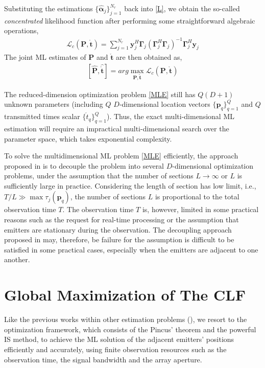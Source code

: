 \documentclass[review]{elsarticle}
\begin{document}
Substituting the estimations $\lbrace \hat{\boldsymbol{\alpha}}_j\rbrace _{j=1}^{N_r}$ back into \eqref{L}, we obtain the so-called \emph{concentrated} likelihood function after performing some straightforward algebraic operations,
\begin{align}\label{CLF}
    \mathcal{L}_c(\boldsymbol{P},\mathring{\boldsymbol{t}})=\sum_{j=1}^{N_r}\boldsymbol{y}_j^H\boldsymbol{\Gamma}_{j}(\boldsymbol{\Gamma}_{j}^H\boldsymbol{\Gamma}_{j})^{-1}\boldsymbol{\Gamma}_{j}^H\boldsymbol{y}_j
\end{align}
The joint ML estimates of $\boldsymbol{P}$ and $\mathring{\boldsymbol{t}}$ are then obtained as,
\begin{align}\label{MLE}
    [\hat{\boldsymbol{P}},\hat{\mathring{\boldsymbol{t}}}]=arg \max_{\boldsymbol{P},\mathring{\boldsymbol{t}}} \mathcal{L}_c(\boldsymbol{P},\mathring{\boldsymbol{t}})
\end{align}

The reduced-dimension optimization problem \eqref{MLE} still has $Q(D+1)$ unknown parameters (including $Q$ $D$-dimensional location vectors $\lbrace \boldsymbol{p}_q\rbrace_{q=1}^Q$ and $Q$ transmitted times scalar $\lbrace \mathring{t}_q\rbrace_{q=1}^Q$). Thus, the exact multi-dimensional ML estimation will require an impractical multi-dimensional search over the parameter space, which takes exponential complexity.

To solve the multidimensional ML problem \eqref{MLE} efficiently, the approach proposed in \cite{DPD2005} is to decouple the problem into several $D$-dimensional optimization problems, under the assumption that the number of sections $L\to \infty$ or $L$ is sufficiently large in practice. Considering the length of section has low limit, i.e., $T/L\gg \max{\tau_j(\boldsymbol{p}_q)}$, the number of sections $L$ is proportional to the total observation time $T$. The observation time $T$ is, however, limited in some practical reasons such as the request for real-time processing or the assumption that emitters are stationary during the observation. The decoupling approach proposed in \cite{DPD2005} may, therefore, be failure for the assumption is difficult to be satisfied in some practical cases, especially when the emitters are adjacent to one another.

\section{Global Maximization of The CLF}\label{sec3}
Like the previous works within other estimation problems (\cite{ISdoa2008,Kay2000Mean,Saha2002Maximum,Wang2010Maximum,Chen2008Joint}), we resort to the optimization framework, which consists of the Pincus' theorem and the powerful IS method, to achieve the ML solution of the adjacent emitters' positions efficiently and accurately, using finite observation resources such as the observation time, the signal bandwidth and the array aperture.
\end{document}
